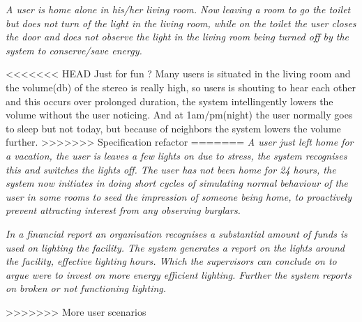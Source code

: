 \textit{A user is home alone in his/her living room. Now leaving a room to go the toilet but does not turn of the light in the living room, while on the toilet the user closes the door and does not observe the light in the living room being turned off by the system to conserve/save energy.}

<<<<<<< HEAD
Just for fun ? Many users is situated in the living room and the volume(db) of the stereo is really high, so users is shouting to hear each other and this occurs over prolonged duration, the system intellingently lowers the volume without the user noticing. And at 1am/pm(night) the user normally goes to sleep but not today, but because of neighbors the system lowers the volume further.
>>>>>>> Specification refactor
=======
\textit{A user just left home for a vacation, the user is leaves a few lights on due to stress, the system recognises this and switches the lights off. The user has not been home for 24 hours, the system now initiates in doing short cycles of simulating normal behaviour of the user in some rooms to seed the impression of someone being home, to proactively prevent attracting interest from any observing burglars.}

\textit{In a financial report an organisation recognises a substantial amount of funds is used on lighting the facility. The system generates a report on the lights around the facility, effective lighting hours. Which the supervisors can conclude on to argue were to invest on more energy efficient lighting. Further the system reports on broken or not functioning lighting.}


>>>>>>> More user scenarios

